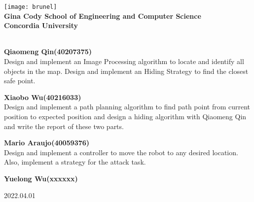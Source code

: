 \begin{titlepage}
  \begin{center}
    \texttt{[image: brunel]}\\[1cm]

    \textbf{\large Gina Cody School of Engineering and Computer Science}\\[0.5cm]

      \textbf{\LARGE Concordia University}\\[0.75cm]
      \textbf{\LARGE \Title}\\[0.75cm]

  \end{center}

\textbf{\large Qiaomeng Qin(40207375)}\\[0.5cm]
Design and implement an Image Processing algorithm to locate and identify all objects in the map. Design and implement an Hiding Strategy to find the closest safe point.

\textbf{\large Xiaobo Wu(40216033)}\\[0.5cm]
Design and implement a path planning algorithm to find path point from current position to expected position and design a hiding algorithm with Qiaomeng Qin and write the report of these two parts.

\textbf{\large Mario Araujo(40059376)}\\[0.5cm]
Design and implement a controller to move the robot to any desired location. Also, implement a strategy for the attack task.

\textbf{\large Yuelong Wu(xxxxxx)}\\[0.5cm]

\begin{center}
\textsc{\footnotesize{2022.04.01}}\\
\end{center}

\end{titlepage}
